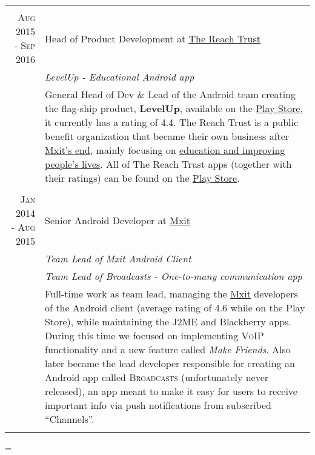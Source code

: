 \documentclass[a4paper,10pt,notitlepage]{article}
\newenvironment{absolutelynopagebreak}
  {\par\nobreak\vfil\penalty0\vfilneg
   \vtop\bgroup}
  {\par\xdef\tpd{\the\prevdepth}\egroup
   \prevdepth=\tpd}
\begin{document}
\begin{absolutelynopagebreak}
\begin{tabular}{r|p{11cm}}
{		\multicolumn{2}{c}{} \\
		\textsc{Aug 2015 - Sep 2016} & Head of Product Development at \href{www.thereachtrust.org}{The Reach Trust} \\                                                                  &\emph{LevelUp -  Educational Android app} \\
		                            &\footnotesize{General Head of Dev \& Lead of the Android team creating the  flag-ship product, \textbf{LevelUp}, available on the \href{https://play.google.com/store/apps/details?id=org.mylevelup}{Play Store}, it currently has a rating of 4.4. The Reach Trust is a public benefit organization that became their own business after \href{https://memeburn.com/2015/10/mxit-confirms-its-shutting-up-shop/}{Mxit's end}, mainly focusing on \href{https://it-online.co.za/2015/10/26/reach-trust-will-use-mxit-for-education/}{education and improving people's lives}. All of The Reach Trust apps (together with their ratings) can be found on the \href{https://play.google.com/store/apps/dev?id=7356513661681471434}{Play Store}.} \\
		 
		\multicolumn{2}{c}{} \\
		\textsc{Jan 2014 - Aug 2015} & Senior Android Developer at \href{www.mxit.com}{Mxit} \\
		                             & \emph{Team Lead of Mxit Android Client} \\
		                             & \emph{Team Lead of Broadcasts - One-to-many communication app} \\
		                             & \footnotesize{Full-time work as team lead, managing the \href{https://en.wikipedia.org/wiki/Mxit}{Mxit} developers of the Android client (average rating of 4.6 while on the Play Store), while maintaining the J2ME and Blackberry apps. During this time we focused on implementing \textsc{VoIP} functionality and a new feature called \textit{Make Friends}. Also later became the lead developer responsible for creating an Android app called \textsc{Broadcasts} (unfortunately never released), an app meant to make it easy for users to receive important info via push notifications from subscribed ``Channels''.} \\
		 
}
\end{tabular}
\end{absolutelynopagebreak}
\end{document}
